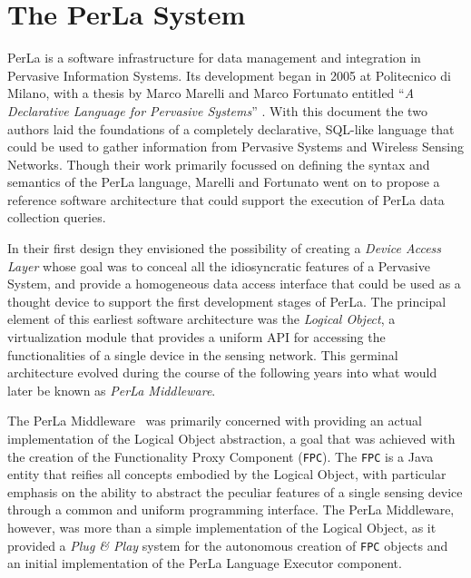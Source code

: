 \chapter{The PerLa System}

PerLa is a software infrastructure for data management and integration in
Pervasive Information Systems. Its development began in 2005 at Politecnico di
Milano, with a thesis by Marco Marelli and Marco Fortunato entitled ``\textit{A
Declarative Language for Pervasive Systems}'' \cite{mm_thesis}. With this
document the two authors laid the foundations of a completely declarative,
SQL-like language that could be used to gather information from Pervasive
Systems and Wireless Sensing Networks. Though their work primarily focussed on
defining the syntax and semantics of the PerLa language, Marelli and Fortunato
went on to propose a reference software architecture that could support the
execution of PerLa data collection queries.

In their first design they envisioned the possibility of creating a
\textit{Device Access Layer} whose goal was to conceal all the idiosyncratic
features of a Pervasive System, and provide a homogeneous data access interface
that could be used as a thought device to support the first development stages
of PerLa. The principal element of this earliest software architecture was the
\textit{Logical Object}, a virtualization module that provides a uniform API
for accessing the functionalities of a single device in the sensing network.
This germinal architecture evolved during the course of the following years
into what would later be known as \textit{PerLa Middleware}. 

The PerLa Middleware~\cite{tse_perla} was primarily concerned with providing an
actual implementation of the Logical Object abstraction, a goal that was
achieved with the creation of the Functionality Proxy Component (\texttt{FPC}).
The \texttt{FPC} is a Java entity that reifies all concepts embodied by the
Logical Object, with particular emphasis on the ability to abstract the
peculiar features of a single sensing device through a common and uniform
programming interface. The PerLa Middleware, however, was more than a simple
implementation of the Logical Object, as it provided a \textit{Plug \& Play}
system for the autonomous creation of \texttt{FPC} objects and an initial
implementation of the PerLa Language Executor component.


